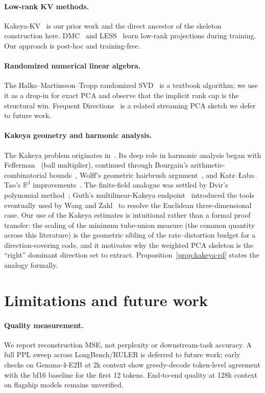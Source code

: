 \documentclass[11pt,a4paper]{article}
\theoremstyle{definition}
\theoremstyle{plain}
\newcommand{\R}{\mathbb{R}}
\begin{document}
\paragraph{Low-rank KV methods.} Kakeya-KV~\cite{kakeya-kv} is our prior work and the direct ancestor of the skeleton construction here. DMC~\cite{dmc} and LESS~\cite{less} learn low-rank projections during training. Our approach is post-hoc and training-free.

\paragraph{Randomized numerical linear algebra.} The Halko--Martinsson--Tropp randomized SVD~\cite{halko-martinsson-tropp} is a textbook algorithm; we use it as a drop-in for exact PCA and observe that the implicit rank cap is the structural win. Frequent Directions~\cite{frequent-directions} is a related streaming PCA sketch we defer to future work.

\paragraph{Kakeya geometry and harmonic analysis.} The Kakeya problem originates in~\cite{kakeya-problem}. Its deep role in harmonic analysis began with Fefferman~\cite{fefferman-ball} (ball multiplier), continued through Bourgain's arithmetic-combinatorial bounds~\cite{bourgain-kakeya}, Wolff's geometric hairbrush argument~\cite{wolff-kakeya}, and Katz--{\L}aba--Tao's $\R^3$ improvements~\cite{katz-laba-tao}. The finite-field analogue was settled by Dvir's polynomial method~\cite{dvir-finite-field}; Guth's multilinear-Kakeya endpoint~\cite{guth-endpoint} introduced the tools eventually used by Wang and Zahl~\cite{wang-zahl} to resolve the Euclidean three-dimensional case. Our use of the Kakeya estimates is intuitional rather than a formal proof transfer: the scaling of the minimum tube-union measure (the common quantity across this literature) is the geometric sibling of the rate--distortion budget for a direction-covering code, and it motivates why the weighted PCA skeleton is the ``right'' dominant direction set to extract. Proposition~\ref{prop:kakeya-rd} states the analogy formally.

\section{Limitations and future work}
\label{sec:limitations}

\paragraph{Quality measurement.} We report reconstruction MSE, not perplexity or downstream-task accuracy. A full PPL sweep across LongBench/RULER is deferred to future work; early checks on Gemma-4-E2B at 2k context show greedy-decode token-level agreement with the bf16 baseline for the first 12 tokens. End-to-end quality at 128k context on flagship models remains unverified.
\end{document}
